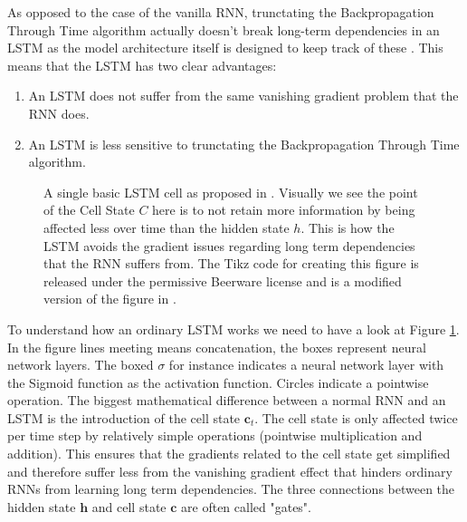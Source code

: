 As opposed to the case of the vanilla RNN, trunctating the Backpropagation Through 
Time algorithm actually doesn't break long-term dependencies in an LSTM as the 
model architecture itself is designed to keep track of these \cite{graves2012long}.
This means that the LSTM has two clear advantages:
\begin{enumerate}
	\item An LSTM does not suffer from the same vanishing gradient problem that the RNN does.
	\item An LSTM is less sensitive to trunctating the Backpropagation Through Time algorithm.
\end{enumerate}

\begin{figure}
\centering
    
\caption{A single basic LSTM cell as proposed in \cite{hochreiter1997long}. Visually we see the point of the Cell State $C$ here is to not retain more information 
by being affected less over time than the hidden state $h$. This is how the LSTM 
avoids the gradient issues regarding long term dependencies that the RNN suffers 
from.
The Tikz code for creating this figure is released under the permissive Beerware license 
and is a modified version of the figure in \cite{tikzlstm}.
}
\label{LSTM figure}
\end{figure}
To understand how an ordinary LSTM works we need to have a look at Figure \ref{LSTM figure}.
In the figure lines meeting means concatenation, the boxes represent neural network layers. The boxed $\sigma$ for instance indicates a neural network layer with the Sigmoid function 
as the activation function. Circles indicate a pointwise operation.
The biggest mathematical difference between a normal RNN and an LSTM is the introduction 
of the cell state $\bm{c}_t$. The cell state is only affected twice per time step 
by relatively simple operations (pointwise multiplication and addition). This 
ensures that the gradients related to the cell state get simplified and therefore 
suffer less from the vanishing gradient effect that hinders ordinary RNNs from 
learning long term dependencies. The three connections between the hidden state 
$\bm{h}$ and cell state $\bm{c}$ are often called "gates".
